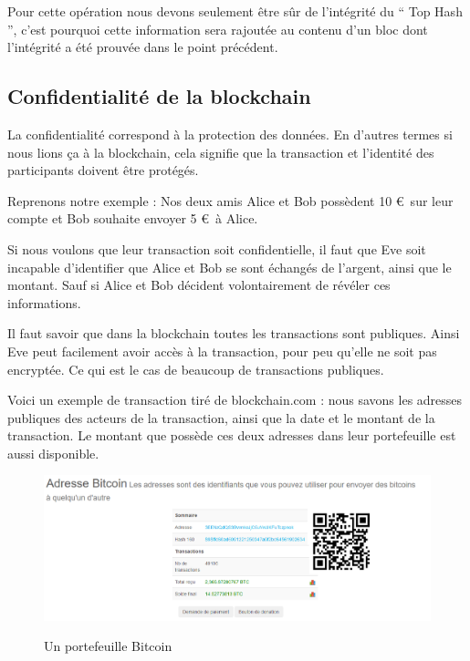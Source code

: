 \documentclass[12pt, a4paper, oneside]{book}
\begin{document}
    Pour cette opération nous devons seulement être sûr de l’intégrité du \hyphenquote{french}{ Top Hash }, c’est pourquoi cette information sera rajoutée au contenu d’un bloc dont l'intégrité a été prouvée dans le point précédent.\cite{merkle}
    
    \subsection {Confidentialité de la blockchain}
    La confidentialité correspond à la protection des données. En d’autres termes si nous lions ça à la blockchain, cela signifie que la transaction et l’identité des participants doivent être protégés. 
    
    Reprenons notre exemple :
    Nos deux amis Alice et Bob possèdent 10 \euro~sur leur compte et Bob souhaite envoyer 5 \euro~à Alice. 
    
    Si nous voulons que leur transaction soit confidentielle, il faut que Eve soit incapable d’identifier que Alice et Bob se sont échangés de l’argent, ainsi que le montant. Sauf si Alice et Bob décident volontairement de révéler ces informations. 
    
    Il faut savoir que dans la blockchain toutes les transactions sont publiques. Ainsi Eve peut facilement avoir accès à la transaction, pour peu qu’elle ne soit pas encryptée. Ce qui est le cas de beaucoup de transactions publiques. 
    
    Voici un exemple de transaction tiré de blockchain.com : nous savons les adresses publiques des acteurs de la transaction, ainsi que la date et le montant de la transaction. Le montant que possède ces deux adresses dans leur portefeuille est aussi disponible.

    \begin{figure}[H]
        \begin{center}
          \includegraphics[width=\textwidth]{images/portefeuille.png}
          \label{fig:portefeuille}
          \caption{Un portefeuille Bitcoin}
        \end{center}
    \end{figure}
\end{document}
